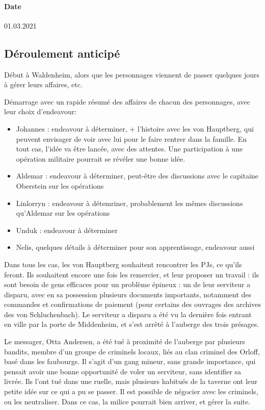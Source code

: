 \documentclass[10pt,a4paper]{book}
\begin{document}
\paragraph{Date}01.03.2021
\subsection{Déroulement anticipé}
Début à Waldenheim, alors que les personnages viennent de passer quelques jours à gérer leurs affaires, etc.

Démarrage avec un rapide résumé des affaires de chacun des personnages, avec leur choix d'endeavour:
\begin{itemize}
\item Johannes : endeavour à déterminer, + l'histoire avec les von Hauptberg, qui peuvent envisager de voir avec lui pour le faire rentrer dans la famille. En tout cas, l'idée va être lancée, avec des attentes. Une participation à une opération militaire pourrait se révéler une bonne idée.
\item Aldemar : endeavour à déterminer, peut-être des discussions avec le capitaine Oberstein sur les opérations
\item Linlorryn : endeavour à détemriner, probablement les mêmes discussions qu'Aldemar sur les opérations
\item Unduk : endeavour à déterminer
\item Nelis, quelques détails à déterminer pour son apprentissage, endeavour aussi
\end{itemize}
Dans tous les cas, les von Hauptberg souhaitent rencontrer les PJs, ce qu'ils feront. Ils souhaitent encore une fois les remercier, et leur proposer un travail : ils sont besoin de gens efficaces pour un problème épineux : un de leur serviteur a disparu, avec en sa possession plusieurs documents importants, notamment des commandes et confirmations de paiement (pour certains des ouvrages des archives des von Schluchenbach). Le serviteur a disparu a été vu la dernière fois entrant en ville par la porte de Middenheim, et s'est arrêté à l'auberge des trois présages.

Le messager, Otta Andersen, a été tué à proximité de l'auberge par plusieurs bandits, membre d'un groupe de criminels locaux, liés au clan criminel des Orloff, basé dans les faubourgs. Il s'agit d'un gang mineur, sans grande importance, qui pensait avoir une bonne opportunité de voler un serviteur, sans identifier sa livrée. Ils l'ont tué dans une ruelle, mais plusieurs habitués de la taverne ont leur petite idée sur ce qui a pu se passer. Il est possible de négocier avec les criminels, ou les neutraliser. Dans ce cas, la milice pourrait bien arriver, et gérer la suite.
\end{document}
